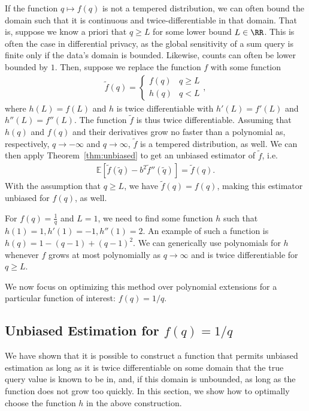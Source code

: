 \documentclass[11pt]{article}
\begin{document}
If the function $q \mapsto f(q)$ is not a tempered distribution, we can often bound the domain such that it is continuous and twice-differentiable in that domain. That is, suppose we know a priori that $q \ge L$ for some lower bound $L \in \RR$. This is often the case in differential privacy, as the global sensitivity of a sum query is finite only if the data's domain is bounded. Likewise, counts can often be lower bounded by $1$. Then, suppose we replace the function $f$ with some function
\begin{align}
    \label{eq:f-tilde-def} 
    \tilde{f}(q) = \left\{\begin{matrix} f(q) & q \ge L\\ h(q) & q < L\end{matrix}  \right.,
\end{align}
where $h(L) = f(L)$ and $h$ is twice differentiable with $h'(L) = f'(L)$ and $h''(L) = f''(L)$. The function $\tilde{f}$ is thus twice differentiable. Assuming that $h(q)$ and $f(q)$ and their derivatives grow no faster than a polynomial as, respectively, $q \to -\infty$ and $q \to \infty$, $\tilde{f}$ is a tempered distribution, as well. We can then apply Theorem~\ref{thm:unbiased} to get an unbiased estimator of $\tilde f$, i.e.
\begin{align}
    \mathbb{E}\left[\tilde{f}(\tilde{q}) - b^2 \tilde{f}''(\tilde{q})\right] = \tilde{f}(q).
\end{align}
With the assumption that $q \ge L$, we have $\tilde{f}(q) = f(q)$, making this estimator unbiased for $f(q)$, as well.

\begin{example}
\label{ex:taylor}
    For $f(q) = \frac{1}{q}$ and $L = 1$, we need to find some function $h$ such that $h(1) = 1, h'(1) = -1, h''(1) = 2$. An example of such a function is $h(q) = 1 - (q-1) + (q-1)^2.$ We can generically use polynomials for $h$ whenever $f$ grows at most polynomially as $q \rightarrow \infty$ and is twice differentiable for $q \geq L$.
\end{example}

We now focus on optimizing this method over polynomial extensions for a particular function of interest: $f(q) = 1/q$.

\subsection{Unbiased Estimation for $f(q) = 1/q$}
\label{subsec:UnbiasEstForInverse}

We have shown that it is possible to construct a function that permits unbiased estimation as long as it is twice differentiable on some domain that the true query value is known to be in, and, if this domain is unbounded, as long as the function does not grow too quickly.
In this section, we show how to optimally choose the function $h$ in the above construction.
\end{document}
